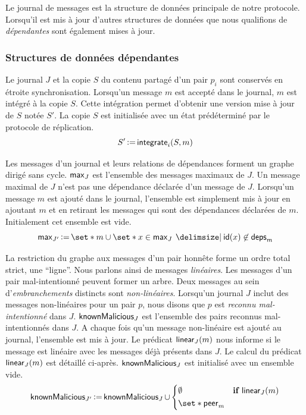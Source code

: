 Le journal de messages est la structure de données principale de notre protocole.
Lorsqu'il est mis à jour d'autres structures de données que nous qualifions de \emph{dépendantes} sont également mises à jour.

\subsubsection{Structures de données dépendantes}

Le journal $J$ et la copie $S$ du contenu partagé d'un pair $p_i$ sont conservés en étroite synchronisation.
Lorsqu'un message $m$ est accepté dans le journal, $m$ est intégré à la copie $S$.
Cette intégration permet d'obtenir une version mise à jour de $S$ notée $S'$.
La copie $S$ est initialisée avec un état prédéterminé par le protocole de réplication.
%
\begin{equation}
    S' \operatorname{\vcentcolon=} \operatorname{\mathsf{integrate}}_i(S, m)
\end{equation}

Les messages d'un journal et leurs relations de dépendances forment un graphe dirigé sans cycle.
$\operatorname{\mathsf{max}}_J$ est l'ensemble des messages maximaux de $J$.
Un message maximal de $J$ n'est pas une dépendance déclarée d'un message de $J$.
Lorsqu'un message $m$ est ajouté dans le journal, l'ensemble est simplement mis à jour en ajoutant $m$ et en retirant les messages qui sont des dépendances déclarées de $m$.
Initialement cet ensemble est vide.
%
\begin{equation}
    \trm{max}_{J'} \assign \set*{m} \cup \set*{x \in \trm{max}_J \given \trm{id}(x) \not\in \trm{deps}_m}
\end{equation}

La restriction du graphe aux messages d'un pair honnête forme un ordre total strict, une \enquote{ligne}.
Nous parlons ainsi de messages \emph{linéaires}.
Les messages d'un pair mal-intentionné peuvent former un arbre.
Deux messages au sein d'\emph{embranchements} distincts sont \emph{non-linéaires}.
Lorsqu'un journal $J$ inclut des messages non-linéaires pour un pair $p$, nous disons que $p$ est \emph{reconnu mal-intentionné} dans $J$.
$\operatorname{\mathsf{knownMalicious}}_J$ est l'ensemble des pairs reconnus mal-intentionnés dans $J$.
A chaque fois qu'un message non-linéaire est ajouté au journal, l'ensemble est mis à jour.
Le prédicat $\operatorname{\mathsf{linear}}_J(m)$ nous informe si le message est linéaire avec les messages déjà présents dans $J$.
Le calcul du prédicat $\operatorname{\mathsf{linear}}_J(m)$ est détaillé ci-après.
$\operatorname{\mathsf{knownMalicious}}_J$ est initialisé avec un ensemble vide.
%
\begin{equation}
    \trm{knownMalicious}_{J'} \assign \trm{knownMalicious}_J \cup \begin{dcases}
        \emptyset & \when \trm{linear}_J(m)\\
        \set*{\trm{peer}_m} &
    \end{dcases}
\end{equation}


